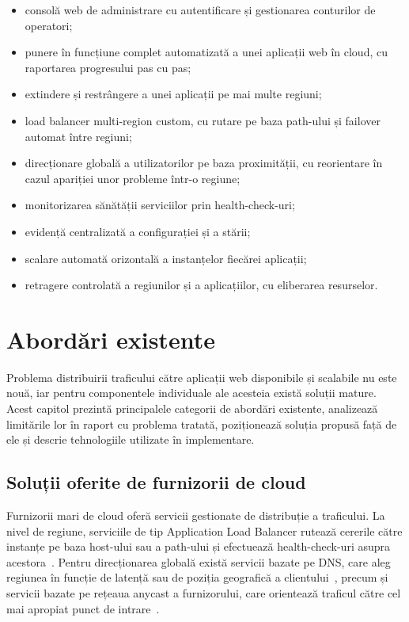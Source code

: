 \documentclass[12pt,a4paper]{report}
\begin{document}
\begin{itemize}
	\item consolă web de administrare cu autentificare și gestionarea conturilor de operatori;
	\item punere în funcțiune complet automatizată a unei aplicații web în cloud, cu raportarea progresului pas cu pas;
	\item extindere și restrângere a unei aplicații pe mai multe regiuni;
	\item load balancer multi-region custom, cu rutare pe baza path-ului și failover automat între regiuni;
	\item direcționare globală a utilizatorilor pe baza proximității, cu reorientare în cazul apariției unor probleme într-o regiune;
	\item monitorizarea sănătății serviciilor prin health-check-uri;
	\item evidență centralizată a configurației și a stării;
	\item scalare automată orizontală a instanțelor fiecărei aplicații;
	\item retragere controlată a regiunilor și a aplicațiilor, cu eliberarea resurselor.
\end{itemize}

\chapter{Abordări existente}

Problema distribuirii traficului către aplicații web disponibile și scalabile nu este nouă, iar pentru componentele individuale ale acesteia există soluții mature. Acest capitol prezintă principalele categorii de abordări existente, analizează limitările lor în raport cu problema tratată, poziționează soluția propusă față de ele și descrie tehnologiile utilizate în implementare.

\section{Soluții oferite de furnizorii de cloud}
Furnizorii mari de cloud oferă servicii gestionate de distribuție a traficului. La nivel de regiune, serviciile de tip Application Load Balancer rutează cererile către instanțe pe baza host-ului sau a path-ului și efectuează health-check-uri asupra acestora~\cite{aws-elb}. Pentru direcționarea globală există servicii bazate pe DNS, care aleg regiunea în funcție de latență sau de poziția geografică a clientului~\cite{aws-route53}, precum și servicii bazate pe rețeaua anycast a furnizorului, care orientează traficul către cel mai apropiat punct de intrare~\cite{aws-globalaccelerator}.
\end{document}
